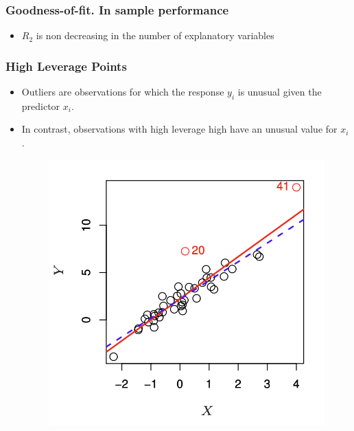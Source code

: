 \documentclass[
  shownotes,
  xcolor={svgnames},
  hyperref={colorlinks,citecolor=DarkBlue,linkcolor=andesred,urlcolor=DarkBlue}
  , aspectratio=169]{beamer}
\begin{document}
\begin{frame}[t]
\frametitle{Goodness-of-fit. In  sample performance}
\begin{itemize}
  \item $R_2$ is non decreasing in the number of explanatory variables

\end{itemize}
\end{frame}
\begin{frame}
\frametitle{ High Leverage Points}

\begin{itemize}
  \item  Outliers are observations for which the response $y_i$ is unusual given the predictor $x_i$.
  \medskip
  \item In contrast, observations with high leverage high have an unusual value for $x_i$.

  \begin{figure}[H] \centering
    \centering
    \includegraphics[scale=0.45]{figures/leverage.png}
  \end{figure}

\end{itemize}

\end{frame}
\end{document}
